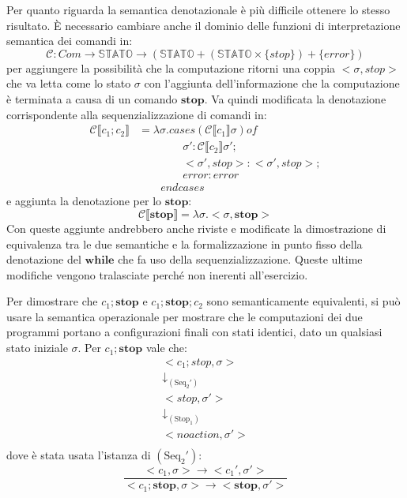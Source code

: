 \documentclass[a4paper,twosides]{report}
\begin{document}
Per quanto riguarda la semantica denotazionale \`e pi\`u difficile
ottenere lo stesso risultato. \`E necessario cambiare anche il dominio
delle funzioni di interpretazione semantica dei comandi in:
$$
\mathcal{C}: Com\longrightarrow{}\mathbb{STATO}\longrightarrow{}(\mathbb{STATO}+(\mathbb{STATO}\times\{stop\})+\{error\})
$$
per aggiungere la possibilit\`a che la computazione ritorni una coppia
$<\sigma,stop>$ che va letta come lo stato $\sigma$ con
l'aggiunta dell'informazione che la computazione \`e terminata a causa
di un comando $\mathbf{stop}$. Va quindi modificata la denotazione
corrispondente alla sequenzializzazione di comandi in:
\begin{align*}
  \mathcal{C}\llbracket c_1;c_2\rrbracket&= \lambda\sigma.cases (\mathcal{C}\llbracket c_1\rrbracket\sigma)
  of\\
&\qquad\qquad\sigma':\mathcal{C}\llbracket c_2\rrbracket\sigma';\\
&\qquad\qquad<\sigma',stop>:<\sigma',stop>;\\
&\qquad\qquad error : error\\
&\qquad endcases
\end{align*}
e aggiunta la denotazione per lo $\mathbf{stop}$:
$$
\mathcal{C}\llbracket\mathbf{stop}\rrbracket=\lambda\sigma.<\sigma,\mathbf{stop}>
$$
Con queste aggiunte andrebbero anche riviste e  modificate la dimostrazione di
equivalenza tra le due semantiche e la formalizzazione in punto fisso della
denotazione del $\mathbf{while}$ che fa uso della
sequenzializzazione. Queste ultime modifiche vengono tralasciate
perch\'e non inerenti all'esercizio.

Per dimostrare che $c_1;\mathbf{stop}$ e $c_1;\mathbf{stop};c_2$ sono
semanticamente equivalenti, si pu\`o usare la semantica operazionale
per mostrare che le computazioni dei due programmi portano a
configurazioni finali con stati identici, dato
un qualsiasi
stato iniziale $\sigma$.
Per $c_1;\mathbf{stop}$ vale che:
\begin{gather*}
  <c_1;stop,\sigma>\\
  \downarrow_{(\text{Seq}_2')}\\
  <stop,\sigma'>\\
  \downarrow_{(\text{Stop}_1)}\\
  <noaction,\sigma'>\\
\end{gather*}
dove \`e stata usata l'istanza di $(\text{Seq}_2')$:
$$
\frac{<c_1,\sigma> \longrightarrow{}
  <c_1',\sigma'>}{<c_1;\mathbf{stop},\sigma> \longrightarrow{}
  <\mathbf{stop},\sigma'>}
$$
\end{document}
